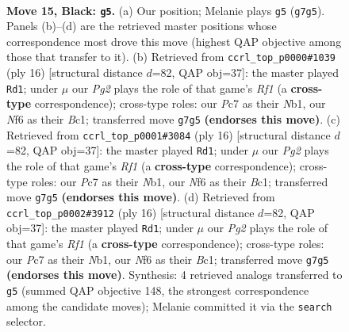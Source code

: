 \documentclass[11pt]{article}
\begin{document}
\begin{figure}[p]\centering
\begin{subfigure}{0.46\textwidth}\centering
\resizebox{\linewidth}{!}{%
\newchessgame
\chessboard[
  setfen={r1b2r2/p1ppqpp1/2n1pn1k/1Qp4p/3P4/2B2NP1/PP1KPP1P/R4B1R b - - 3 15},
  showmover=false,
  pgfstyle=straightmove, color=movearrow, markmove={g7-g5}
]}
\caption{}
\end{subfigure}\hfill
\begin{subfigure}{0.46\textwidth}\centering
\resizebox{\linewidth}{!}{%
\newchessgame
\chessboard[
  setfen={r1b1kb1r/1pq2ppp/p1n1pn2/2p5/P1BP4/4PN2/1P2QPPP/RNB2RK1 w kq - 3 9},
  showmover=false,
  pgfstyle=straightmove, color=movearrow, markmove={f1-d1}
]}
\caption{}
\end{subfigure}
\\[4pt]
\begin{subfigure}{0.46\textwidth}\centering
\resizebox{\linewidth}{!}{%
\newchessgame
\chessboard[
  setfen={r1b1kb1r/1pq2ppp/p1n1pn2/2p5/P1BP4/4PN2/1P2QPPP/RNB2RK1 w kq - 3 9},
  showmover=false,
  pgfstyle=straightmove, color=movearrow, markmove={f1-d1}
]}
\caption{}
\end{subfigure}\hfill
\begin{subfigure}{0.46\textwidth}\centering
\resizebox{\linewidth}{!}{%
\newchessgame
\chessboard[
  setfen={r1b1kb1r/1pq2ppp/p1n1pn2/2p5/P1BP4/4PN2/1P2QPPP/RNB2RK1 w kq - 3 9},
  showmover=false,
  pgfstyle=straightmove, color=movearrow, markmove={f1-d1}
]}
\caption{}
\end{subfigure}
\caption{\textbf{Move 15, Black: \texttt{g5}.} (a) Our position; Melanie plays \texttt{g5} (\texttt{g7g5}). Panels (b)--(d) are the retrieved master positions whose correspondence most drove this move (highest QAP objective among those that transfer to it). (b) Retrieved from \texttt{ccrl\_top\_p0000\#1039} (ply 16) [structural distance $d$=82, QAP obj=37]: the master played \texttt{Rd1}; under $\mu$ our \emph{Pg2} plays the role of that game's \emph{Rf1} (a \textbf{cross-type} correspondence); cross-type roles: our \emph{P}c7 as their \emph{N}b1, our \emph{N}f6 as their \emph{B}c1; transferred move \texttt{g7g5} \textbf{(endorses this move)}. (c) Retrieved from \texttt{ccrl\_top\_p0001\#3084} (ply 16) [structural distance $d$=82, QAP obj=37]: the master played \texttt{Rd1}; under $\mu$ our \emph{Pg2} plays the role of that game's \emph{Rf1} (a \textbf{cross-type} correspondence); cross-type roles: our \emph{P}c7 as their \emph{N}b1, our \emph{N}f6 as their \emph{B}c1; transferred move \texttt{g7g5} \textbf{(endorses this move)}. (d) Retrieved from \texttt{ccrl\_top\_p0002\#3912} (ply 16) [structural distance $d$=82, QAP obj=37]: the master played \texttt{Rd1}; under $\mu$ our \emph{Pg2} plays the role of that game's \emph{Rf1} (a \textbf{cross-type} correspondence); cross-type roles: our \emph{P}c7 as their \emph{N}b1, our \emph{N}f6 as their \emph{B}c1; transferred move \texttt{g7g5} \textbf{(endorses this move)}. Synthesis: 4 retrieved analogs transferred to \texttt{g5} (summed QAP objective 148, the strongest correspondence among the candidate moves); Melanie committed it via the \texttt{search} selector.}
\label{fig:thought-m29}
\end{figure}
\end{document}
